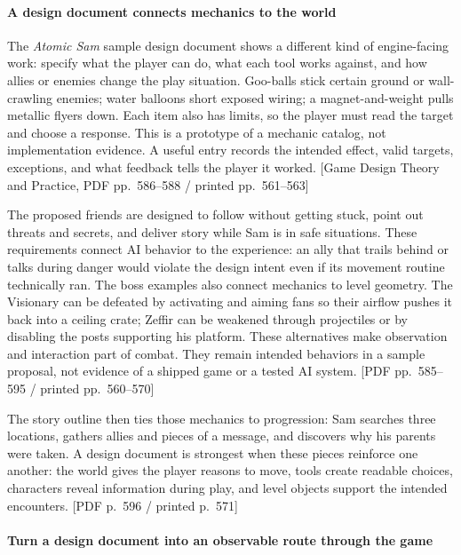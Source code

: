 \paragraph{A design document connects mechanics to the world}\label{05-engine-i-ch009-a-design-document-connects-mechanics-to-the-world}

The \emph{Atomic Sam} sample design document shows a different kind of engine-facing work: specify what the player can do, what each tool works against, and how allies or enemies change the play situation. Goo-balls stick certain ground or wall-crawling enemies; water balloons short exposed wiring; a magnet-and-weight pulls metallic flyers down. Each item also has limits, so the player must read the target and choose a response. This is a prototype of a mechanic catalog, not implementation evidence. A useful entry records the intended effect, valid targets, exceptions, and what feedback tells the player it worked. {[}Game Design Theory and Practice, PDF pp.~586--588 / printed pp.~561--563{]}

The proposed friends are designed to follow without getting stuck, point out threats and secrets, and deliver story while Sam is in safe situations. These requirements connect AI behavior to the experience: an ally that trails behind or talks during danger would violate the design intent even if its movement routine technically ran. The boss examples also connect mechanics to level geometry. The Visionary can be defeated by activating and aiming fans so their airflow pushes it back into a ceiling crate; Zeffir can be weakened through projectiles or by disabling the posts supporting his platform. These alternatives make observation and interaction part of combat. They remain intended behaviors in a sample proposal, not evidence of a shipped game or a tested AI system. {[}PDF pp.~585--595 / printed pp.~560--570{]}

The story outline then ties those mechanics to progression: Sam searches three locations, gathers allies and pieces of a message, and discovers why his parents were taken. A design document is strongest when these pieces reinforce one another: the world gives the player reasons to move, tools create readable choices, characters reveal information during play, and level objects support the intended encounters. {[}PDF p.~596 / printed p.~571{]}

\paragraph{Turn a design document into an observable route through the game}\label{05-engine-i-ch009-turn-a-design-document-into-an-observable-route-through-the-game}

